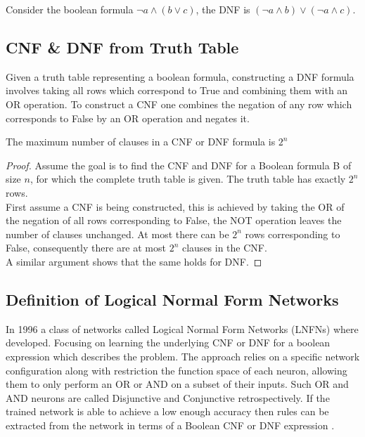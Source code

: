 Consider the boolean formula $\lnot a \land (b \lor c)$, the DNF is $(\lnot a \land b) \lor (\lnot a \land c)$.\\

\subsection{CNF \& DNF from Truth Table} \label{subsec:construct-cnfdnf}
Given a truth table representing a boolean formula, constructing a DNF formula involves taking all rows which correspond to True and combining them with an OR operation. To construct a CNF one combines the negation of any row which corresponds to False by an OR operation and negates it.

\begin{theorem}
	The maximum number of clauses in a CNF or DNF formula is $2^n$
	\label{thm:max-clause-cnfdnf}
\end{theorem}

\begin{proof}
	Assume the goal is to find the CNF and DNF for a Boolean formula B of size $n$, for which the complete truth table is given. The truth table has exactly $2^n$ rows.\\
	
	First assume a CNF is being constructed, this is achieved by taking the OR of the negation of all rows corresponding to False, the NOT operation leaves the number of clauses unchanged. At most there can be $2^n$ rows corresponding to False, consequently there are at most $2^n$ clauses in the CNF.\\
	
	A similar argument shows that the same holds for DNF.
\end{proof}

\subsection{Definition of Logical Normal Form Networks}
In 1996 a class of networks called Logical Normal Form Networks \cite{herrmann1996backpropagation} (LNFNs) where developed. Focusing on learning the underlying CNF or DNF for a boolean expression which describes the problem. The approach relies on a specific network configuration along with restriction the function space of each neuron, allowing them to only perform an OR or AND on a subset of their inputs. Such OR and AND neurons are called Disjunctive and Conjunctive retrospectively. If the trained network is able to achieve a low enough accuracy then rules can be extracted from the network in terms of a Boolean CNF or DNF expression \cite{herrmann1996backpropagation}.\\

